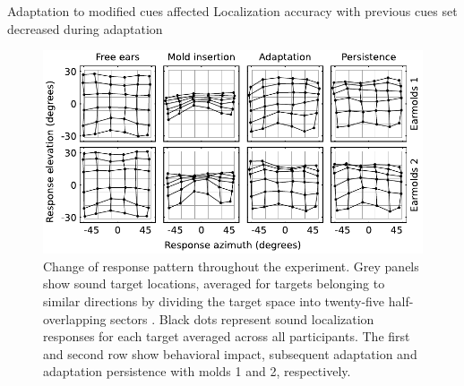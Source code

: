 Adaptation to modified cues affected 
Localization accuracy with previous cues set decreased during adaptation 

 \begin{figure}[ht]
	\includegraphics[width=14cm, center]{../Results/figures/fig7/fig7}
	\caption{Change of response pattern throughout the experiment. Grey panels show sound target locations, averaged for targets belonging to similar directions by dividing the target space into twenty-five half-overlapping sectors \citep{hofman_relearning_1998}. Black dots represent sound localization responses for each target averaged across all participants. The first and second row show behavioral impact, subsequent adaptation and adaptation persistence with molds 1 and 2, respectively.}
        \label{fig:response_evo}
\end{figure}

